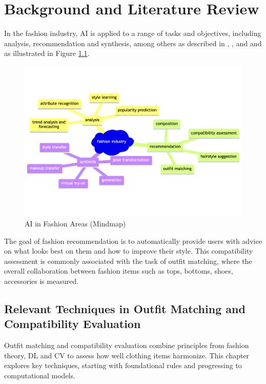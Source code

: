 \chapter{Background and Literature Review}

In the fashion industry, \acs{AI} is applied to a range of tasks and objectives, including analysis, recommendation and synthesis, among others as described in \cite[vgl.]{chen_survey_2023}, \cite[vgl.]{deldjoo_review_2022}, \cite[vgl.]{kouslis_ai_2024} and \cite[vgl.]{cheng_fashion_2020} and as illustrated in Figure \ref{fig:fashion-areas}.

\begin{figure}[h]
  \centering
  \includegraphics[width=\linewidth]{Abbildungen/fashion-areas}
  \caption{AI in Fashion Areas (Mindmap)}
  \label{fig:fashion-areas}
\end{figure}

The goal of fashion recommendation is to automatically provide users with advice on what looks best on them and how to improve their style. This compatibility assessment is commonly associated with the task of outfit matching, where the overall collaboration between fashion items such as tops, bottoms, shoes, accessories is measured. \cite[vgl.]{chen_survey_2023}

\section{Relevant Techniques in Outfit Matching and Compatibility Evaluation}
Outfit matching and compatibility evaluation combine principles from fashion theory, \acs{DL} and \acs{CV} to assess how well clothing items harmonize. This chapter explores key techniques, starting with foundational rules and progressing to computational models.

